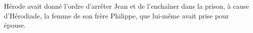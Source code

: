 \encetemps
	Hérode avait donné l’ordre d’arrêter Jean et de l’enchaîner dans la prison,
	à cause d’Hérodiade, la femme de son frère Philippe,
	que lui-même avait prise pour épouse.
